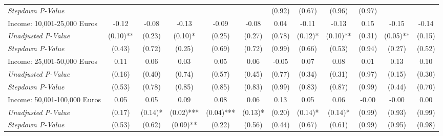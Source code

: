 \begin{tabular}{l c c c c c c c c c c c}
\quad \textit{Stepdown P-Value} &  &  &  &  &  & (0.92) & (0.67) & (0.96) & (0.97) &  &  \\
Income: 10,001-25,000 Euros & -0.12 & -0.08 & -0.13 & -0.09 & -0.08 & 0.04 & -0.11 & -0.13 & 0.15 & -0.15 & -0.14 \\
\quad \textit{Unadjusted P-Value} & (0.10)** & (0.23) & (0.10)* & (0.25) & (0.27) & (0.78) & (0.12)* & (0.10)** & (0.31) & (0.05)** & (0.15) \\
\quad \textit{Stepdown P-Value} & (0.43) & (0.72) & (0.25) & (0.69) & (0.72) & (0.99) & (0.66) & (0.53) & (0.94) & (0.27) & (0.52) \\
Income: 25,001-50,000 Euros & 0.11 & 0.06 & 0.03 & 0.05 & 0.06 & -0.05 & 0.07 & 0.08 & 0.01 & 0.13 & 0.10 \\
\quad \textit{Unadjusted P-Value} & (0.16) & (0.40) & (0.74) & (0.57) & (0.45) & (0.77) & (0.34) & (0.31) & (0.97) & (0.15) & (0.30) \\
\quad \textit{Stepdown P-Value} & (0.53) & (0.78) & (0.85) & (0.85) & (0.83) & (0.99) & (0.83) & (0.87) & (0.99) & (0.44) & (0.70) \\
Income: 50,001-100,000 Euros & 0.05 & 0.05 & 0.09 & 0.08 & 0.06 & 0.13 & 0.05 & 0.06 & -0.00 & -0.00 & 0.00 \\
\quad \textit{Unadjusted P-Value} & (0.17) & (0.14)* & (0.02)*** & (0.04)*** & (0.13)* & (0.20) & (0.14)* & (0.14)* & (0.99) & (0.93) & (0.99) \\
\quad \textit{Stepdown P-Value} & (0.53) & (0.62) & (0.09)** & (0.22) & (0.56) & (0.44) & (0.67) & (0.61) & (0.99) & (0.95) & (0.98) \\
\bottomrule
\end{tabular}

